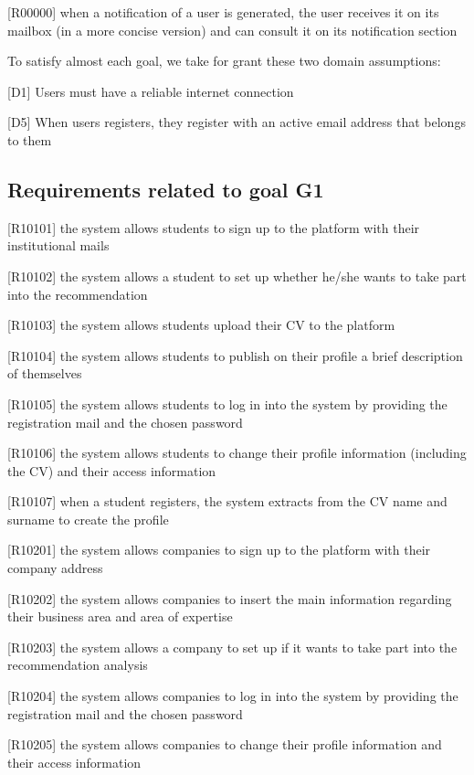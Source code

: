 		[R00000] when a notification of a user is generated, the user receives it on its mailbox (in a more concise version) and can consult it on its notification section
		
		To satisfy almost each goal, we take for grant these two domain assumptions:
		

		[D1] Users must have a reliable internet connection
		
		[D5] When users registers, they register with an active email address that belongs to them
		
		\subsection{Requirements related to goal G1}
		
		[R10101] the system allows students to sign up to the platform with their institutional mails
		
		[R10102] the system allows a student to set up whether he/she wants to take part into the recommendation
		
		[R10103] the system allows students upload their CV to the platform
		
		[R10104] the system allows students to publish on their profile a brief description of themselves
		
		[R10105] the system allows students to log in into the system by providing the registration mail and the chosen	password
		
		[R10106] the system allows students to change their profile information (including the CV) and their access information
		
		[R10107] when a student registers, the system extracts from the CV name and surname to create the profile
		
		[R10201] the system allows companies to sign up to the platform with their company address
		
		[R10202] the system allows companies to insert the main information regarding their business area and area of expertise
		
		[R10203] the system allows a company to set up if it wants to take part into the recommendation analysis
		
		[R10204] the system allows companies to log in into the system by providing the registration mail and the chosen password
		
		[R10205] the system allows companies to change their profile information and their access information
		
